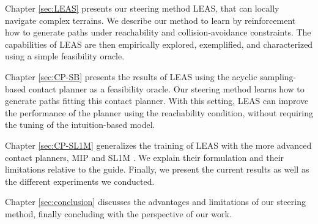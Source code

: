 Chapter \ref{sec:LEAS} presents our steering method LEAS, that can locally navigate complex terrains.
We describe our method to learn by reinforcement how to generate paths under reachability and collision-avoidance constraints.
The capabilities of LEAS are then empirically explored, exemplified, and characterized using a simple feasibility oracle.

Chapter \ref{sec:CP-SB} presents the results of LEAS using the acyclic sampling-based contact planner \cite{AcyclicCP} as a feasibility oracle.
Our steering method learns how to generate paths fitting this contact planner. 
With this setting, LEAS can improve the performance of the planner using the reachability condition, without requiring the tuning of the intuition-based model.

Chapter \ref{sec:CP-SL1M} generalizes the training of LEAS with the more advanced contact planners, MIP and SL1M \cite{sl1m_v2}.
We explain their formulation and their limitations relative to the guide. Finally, we present the current results as well as the different experiments we conducted.

Chapter \ref{sec:conclusion} discusses the advantages and limitations of our steering method, finally concluding with the perspective of our work.